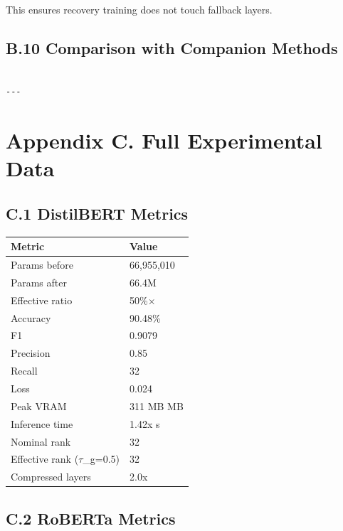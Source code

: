 This ensures recovery training does not touch fallback layers.

\subsection{B.10 Comparison with Companion Methods}

\begin{lstlisting}

---
\end{lstlisting}


\section{Appendix C. Full Experimental Data}

\subsection{C.1 DistilBERT Metrics}

\begin{table}[H]
\centering
\small
\begin{tabular}{ll}
\toprule
\textbf{Metric} & \textbf{Value} \\
\midrule
Params before & 66,955,010 \\
Params after & 66.4M \\
Effective ratio & 50\%$\times$ \\
Accuracy & 90.48\% \\
F1 & 0.9079 \\
Precision & 0.85 \\
Recall & 32 \\
Loss & 0.024 \\
Peak VRAM & 311 MB MB \\
Inference time & 1.42x s \\
Nominal rank & 32 \\
Effective rank ($\tau$\_g=0.5) & 32 \\
Compressed layers & 2.0x \\
\bottomrule
\end{tabular}
\end{table}

\subsection{C.2 RoBERTa Metrics}

